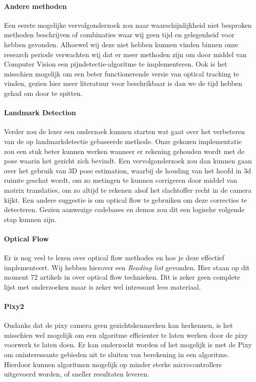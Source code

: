 \documentclass[11pt]{article}
\begin{document}
    \paragraph{Andere methoden} Een eerste mogelijke vervolgonderzoek zou naar waarschijnlijkheid niet besproken methoden beschrijven of combinaties waar wij geen tijd en gelegenheid voor hebben gevonden.
    Alhoewel wij deze niet hebben kunnen vinden binnen onze research periode verwachten wij dat er meer methoden zijn om door middel van Computer Vision een pijndetectie-algoritme te implementeren. 
    Ook is het misschien mogelijk om een beter functionerende versie van optical tracking te vinden, gezien hier meer literatuur voor beschrikbaar is dan we de tijd hebben gehad om door te spitten.

    \paragraph{Landmark Detection} Verder zou de lezer een onderzoek kunnen starten wat
    gaat over het verbeteren van de op landmarkdetectie gebaseerde methode. Onze gekozen implementatie zou
    een stuk beter kunnen werken wanneer er rekening gehouden wordt met de pose waarin het gezicht zich bevindt.
    Een vervolgonderzoek zou dan kunnen gaan over het gebruik van 3D pose estimation, waarbij de houding van het hoofd
    in 3d ruimte geschat wordt, om zo metingen te kunnen corrigeren door middel van matrix translaties, om zo altijd te
    rekenen alsof het slachtoffer recht in de camera kijkt.
    Een andere suggestie is om optical flow te gebruiken om deze correcties te detecteren.
    Gezien aanwezige codebases en demos zou dit een logische volgende stap kunnen zijn.

    \paragraph{Optical Flow} Er is nog veel te lezen over optical flow methodes en hoe je deze effectief implementeert.
    Wij hebben hierover een \emph{\citet{Readinglist} Reading list} gevonden.
    Hier staan op dit moment 72 artikels in over optical flow technieken. 
    Dit is zeker geen complete lijst met onderzoeken maar is zeker wel intressant lees materiaal.


    \paragraph{Pixy2} Ondanks dat de pixy camera geen gezichtskenmerken kan herkennen, is het misschien wel mogelijk om een algoritme efficienter te laten werken door de pixy voorwerk te laten doen.
    Er kan onderzocht worden of het mogelijk is met de Pixy om oninteressante gebieden uit te sluiten van berekening in een algoritme.
    Hierdoor kunnen algoritmen mogelijk op minder sterke microcontrollers uitgevoerd worden, of sneller resultaten leveren.
\end{document}
